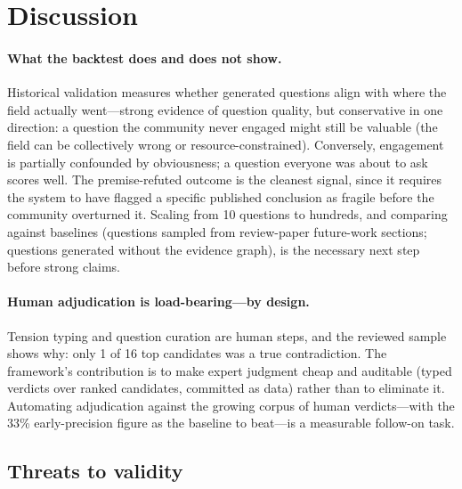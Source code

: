 \section{Discussion}
\label{sec:discussion}

\paragraph{What the backtest does and does not show.}
Historical validation measures whether generated questions align with
where the field actually went---strong evidence of question quality, but
conservative in one direction: a question the community never engaged
might still be valuable (the field can be collectively wrong or
resource-constrained). Conversely, engagement is partially confounded by
obviousness; a question everyone was about to ask scores well. The
premise-refuted outcome is the cleanest signal, since it requires the
system to have flagged a specific published conclusion as fragile before
the community overturned it. Scaling from 10 questions to hundreds, and
comparing against baselines (questions sampled from review-paper
future-work sections; questions generated without the evidence graph),
is the necessary next step before strong claims.

\paragraph{Human adjudication is load-bearing---by design.}
Tension typing and question curation are human steps, and the reviewed
sample shows why: only 1 of 16 top candidates was a true contradiction.
The framework's contribution is to make expert judgment cheap and
auditable (typed verdicts over ranked candidates, committed as data)
rather than to eliminate it. Automating adjudication against the
growing corpus of human verdicts---with the 33\% early-precision figure
as the baseline to beat---is a measurable follow-on task.

\subsection{Threats to validity}
\label{sec:discussion:threats}

